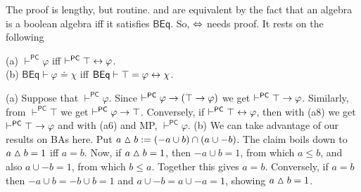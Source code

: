 The proof is lengthy, but routine.  and  are 
equivalent by the fact that an algebra is a boolean algebra iff 
it satisfies $\mathsf{BEq}$. So,  $\Leftrightarrow$  needs 
proof. 
It rests on the following 
\begin{lem}
(a) $\vdash^{\mathsf{PC}} \varphi$ iff 
$\vdash^{\mathsf{PC}} \top \leftrightarrow \varphi$. 
\\
(b) $\mathsf{BEq} \vdash \varphi \doteq \chi$ iff $\mathsf{BEq} \vdash 
\top = \varphi \leftrightarrow \chi$.
\end{lem}
\proofbeg
(a) Suppose that $\vdash^{\mathsf{PC}} \varphi$. Since 
$\vdash^{\mathsf{PC}} \varphi \rightarrow (\top \rightarrow \varphi)$ we get 
$\vdash^{\mathsf{PC}} \top \rightarrow \varphi$. Similarly, from 
$\vdash^{\mathsf{PC}} \top$ we get $\vdash^{\mathsf{PC}} 
\varphi \rightarrow \top$. Conversely, if $\vdash^{\mathsf{PC}} \top 
\leftrightarrow \varphi$, then with (a8) we get $\vdash^{\mathsf{PC}} 
\top \rightarrow \varphi$ and with (a6) and MP, $\vdash^{\mathsf{PC}} 
\varphi$. (b) We can take advantage of our results on BAs here. 
Put $a \vartriangle b := (-a \cup b) \cap (a \cup -b)$. The claim 
boils down to $a \vartriangle b = 1$ iff $a = b$. Now, if $a \vartriangle 
b = 1$, then $-a \cup b = 1$, from which $a \leq b$, and also 
$a \cup -b = 1$, from which $b \leq a$. Together this gives $a = b$. 
Conversely, if $a = b$ then $-a \cup b = -b \cup b = 1$ and 
$a \cup -b = a \cup -a = 1$, showing $a\vartriangle  b = 1$. 
\proofend

